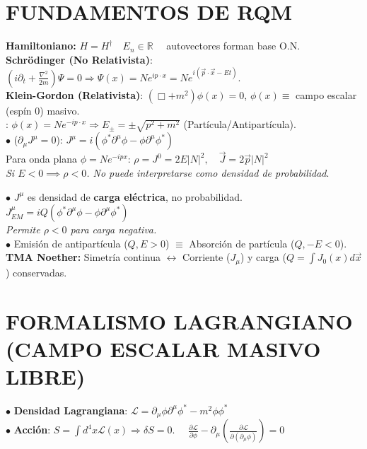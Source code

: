 \section{FUNDAMENTOS DE RQM}
\textbf{Hamiltoniano:} $H = H^\dagger\quad E_n \in \mathbb{R} \quad $ autovectores forman base O.N.\\ 
\textbf{Schrödinger (No Relativista)}: $(i\partial_t + \frac{\nabla^2}{2m})\Psi = 0 \Rightarrow \Psi(x) = Ne^{ip\cdot x}=N e^{i(\vec{p}\cdot\vec{x} - Et)}$.\\
\textbf{Klein-Gordon (Relativista)}: $ (\Box + m^2)\phi(x) = 0 $, $\phi(x) \equiv$ campo escalar (espín 0) masivo.
\\\underline{}: $\phi(x) = N e^{-ip \cdot x} \Rightarrow E_\pm = \pm\sqrt{p^2+m^2}$ (Partícula/Antipartícula).
\\$\bullet$  ($\partial_\mu J^\mu = 0$):
$ J^\mu = i(\phi^* \partial^\mu \phi - \phi \partial^\mu \phi^*) $\\
Para onda plana $\phi = N e^{-ipx}$: $ \rho = J^0 = 2E|N|^2, \quad \vec{J} = 2\vec{p}|N|^2 $\\
{\centering
\textit{Si $E < 0 \implies \rho < 0$. No puede interpretarse como densidad de probabilidad}.\\}

$\bullet$ $J^\mu$ es densidad de \textbf{carga eléctrica}, no probabilidad.
$ J^\mu_{EM} = iQ(\phi^* \partial^\mu \phi - \phi \partial^\mu \phi^*) $\\
{
\centering
\textit{Permite $\rho < 0$ para carga negativa.\\}
}
$\bullet$ Emisión de antipartícula ($Q, E>0$) $\equiv$ Absorción de partícula ($Q, -E<0$).\\
\textbf{TMA Noether:} Simetría continua $\leftrightarrow$ Corriente ($J_\mu$) y carga ($Q =\int J_0(x) d\vec{x} $) conservadas.
\section{FORMALISMO LAGRANGIANO (CAMPO ESCALAR MASIVO LIBRE)}
$\bullet$ \textbf{Densidad Lagrangiana}:
$ \mathcal{L} = \partial_\mu \phi \partial^\mu \phi^* - m^2 \phi \phi^* $\\
$\bullet$ \textbf{Acción}: $S = \int d^4x \mathcal{L}(x) \Rightarrow \delta S = 0. \quad$ 
$ \frac{\partial \mathcal{L}}{\partial \phi} - \partial_\mu \left( \frac{\partial \mathcal{L}}{\partial(\partial_\mu \phi)} \right) = 0 $


